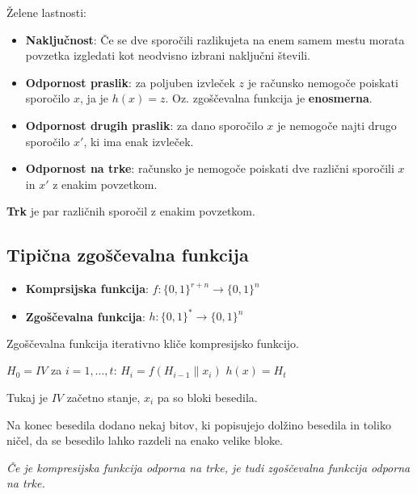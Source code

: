 \begin{multicols}{5}
Želene lastnosti:
\begin{itemize}
	\item \textbf{Naključnost}: Če se dve sporočili razlikujeta na enem samem mestu morata povzetka izgledati kot neodvisno izbrani naključni števili.
	\item \textbf{Odpornost praslik}: za poljuben izvleček $z$ je računsko nemogoče poiskati sporočilo $x$, ja je $h(x) = z$. Oz. zgoščevalna funkcija je \textbf{enosmerna}.
	\item \textbf{Odpornost drugih praslik}: za dano sporočilo $x$ je nemogoče najti drugo sporočilo $x'$, ki ima enak izvleček.
	\item \textbf{Odpornost na trke}: računsko je nemogoče poiskati dve različni sporočili $x$ in $x'$ z enakim povzetkom.
\end{itemize}
\textbf{Trk} je par različnih sporočil z enakim povzetkom.

\subsection*{Tipična zgoščevalna funkcija}
\begin{itemize}
	\item \textbf{Komprsijska funkcija}: $f: \{0,1\}^{r+n} \to \{0,1\}^n$
	\item \textbf{Zgoščevalna funkcija}: $h: \{0,1\}^* \to \{0,1\}^n$
\end{itemize}

Zgoščevalna funkcija iterativno kliče kompresijsko funkcijo.

\begin{koda}
$H_0 = IV$
za $i = 1, \dots, t$:
	$H_i = f(H_{i-1} \| x_i)$
$h(x) = H_t$
\end{koda}

Tukaj je $IV$ začetno stanje, $x_i$ pa so bloki besedila.

Na konec besedila dodano nekaj bitov, ki popisujejo dolžino besedila in toliko ničel, da se besedilo lahko razdeli na enako velike bloke.

\textit{Če je kompresijska funkcija odporna na trke, je tudi zgoščevalna funkcija odporna na trke.}



\end{multicols}

